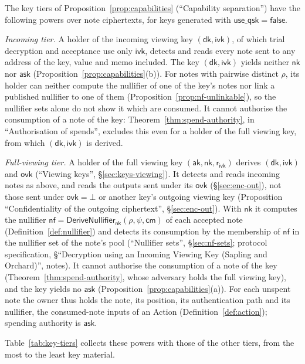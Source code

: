 \documentclass[11pt,a4paper]{article}
\theoremstyle{definition}
\newcommand{\nfsym}{\mathsf{nf}}
\newcommand{\cmsym}{\mathsf{cm}}
\newcommand{\ask}{\ensuremath{\mathsf{ask}}}
\newcommand{\aksym}{\ensuremath{\mathsf{ak}}}
\newcommand{\nksym}{\ensuremath{\mathsf{nk}}}
\newcommand{\ivk}{\ensuremath{\mathsf{ivk}}}
\newcommand{\ovk}{\ensuremath{\mathsf{ovk}}}
\newcommand{\dk}{\ensuremath{\mathsf{dk}}}
\newcommand{\rivk}{\ensuremath{\mathsf{r_{ivk}}}}
\begin{document}
The key tiers of Proposition~\ref{prop:capabilities} (``Capability
separation'') have the following powers over note ciphertexts, for keys
generated with $\mathsf{use\_qsk} = \mathsf{false}$.

\emph{Incoming tier.} A holder of the incoming viewing key $(\dk, \ivk)$, of
which trial decryption and acceptance use only $\ivk$, detects and reads
every note sent to any address of the key, value and memo included. The key
$(\dk, \ivk)$ yields neither $\nksym$ nor $\ask$
(Proposition~\ref{prop:capabilities}(b)). For notes with pairwise distinct
$\rho$, its holder can neither compute the nullifier of one of the key's
notes nor link a published nullifier to one of them
(Proposition~\ref{prop:nf-unlinkable}), so the nullifier sets alone do not
show it which are consumed. It cannot authorise the consumption of a note of
the key: Theorem~\ref{thm:spend-authority}, in ``Authorisation of spends'',
excludes this even for a holder of the full viewing key, from which
$(\dk, \ivk)$ is derived.

\emph{Full-viewing tier.} A holder of the full viewing key
$(\aksym, \nksym, \rivk)$ derives $(\dk, \ivk)$ and $\ovk$ (``Viewing keys'',
\S\ref{sec:keys-viewing}). It detects and reads incoming notes as above, and
reads the outputs sent under its $\ovk$ (\S\ref{sec:enc-out}), not those sent
under $\ovk = \bot$ or another key's outgoing viewing key (Proposition
``Confidentiality of the outgoing ciphertext'', \S\ref{sec:enc-out}). With
$\nksym$ it computes the nullifier
$\nfsym = \mathsf{DeriveNullifier}_{\nksym}(\rho, \psi, \cmsym)$ of each
accepted note (Definition~\ref{def:nullifier}) and detects its consumption by
the membership of $\nfsym$ in the nullifier set of the note's pool
(``Nullifier sets'', \S\ref{sec:nf-sets}; protocol specification,
\S``Decryption using an Incoming Viewing Key (Sapling and Orchard)'',
notes). It cannot authorise the consumption of a note of the key
(Theorem~\ref{thm:spend-authority}, whose adversary holds the full viewing
key), and the key yields no $\ask$ (Proposition~\ref{prop:capabilities}(a)).
For each unspent note the owner thus holds the note, its position, its
authentication path and its nullifier, the consumed-note inputs of an Action
(Definition~\ref{def:action}); spending authority is $\ask$.

Table~\ref{tab:key-tiers} collects these powers with those of the other
tiers, from the most to the least key material.
\end{document}
